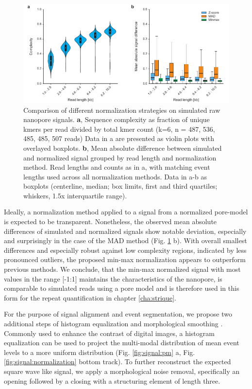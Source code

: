 \begin{figure}[h]
	\centering
	\includegraphics[width=1.0\textwidth]{figures/signal/norm_methods.pdf}
	\captionsetup{format=plain}
	\caption[Signal normalization on simulated reads]{Comparison of different normalization strategies on simulated raw nanopore signals. \textbf{a}, Sequence complexity as fraction of unique kmers per read divided by total kmer count (k=6, n = 487, 536, 485, 485, 507 reads) Data in a are presented as violin plots with overlayed boxplots. \textbf{b}, Mean absolute difference between simulated and normalized signal grouped by read length and normalization method. Read lengths and counts as in a, with matching event lengths used across all normalization methods. Data in a-b as boxplots (centerline, median; box limits, first and third quartiles; whiskers, 1.5x interquartile range).}
	\label{fig:signal:norm_methods}
\end{figure}

Ideally, a normalization method applied to a signal from a normalized pore-model is expected to be transparent. Nonetheless, the observed mean absolute differences of simulated and normalized signals show notable deviation, especially and surprisingly in the case of the MAD method (Fig. \ref{fig:signal:norm_methods} b). With overall smallest differences and especially robust against low complexity regions, indicated by less pronounced outliers, the proposed min-max normalization appears to outperform previous methods. We conclude, that the min-max normalized signal with most values in the range [-1:1] maintains the characteristics of the nanopore, is comparable to simulated reads using a pore model and is therefore used in this form for the repeat quantification in chapter \ref{cha:strique}.

For the purpose of signal alignment and event segmentation, we propose two additional steps of  histogram equalization and morphological smoothing \cite{Gonzalez2006}. Commonly used to enhance the contrast of digital images, a histogram equalization can be used to project the multi-modal distribution of mean event levels to a more uniform distribution (Fig. \ref{fig:signal:pm} a, Fig. \ref{fig:signal:normalization} bottom track). 
To further reconstruct the expected square wave like signal, we apply a morphological noise removal, specifically an opening followed by a closing with a structuring element of length three.

